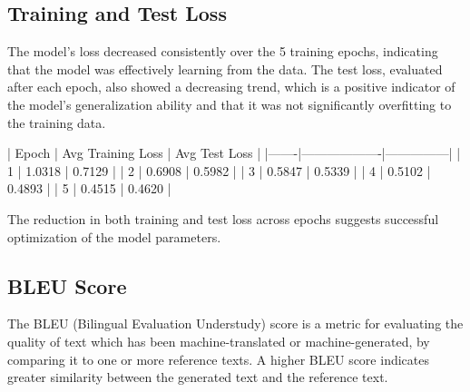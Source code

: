 \documentclass[a4paper, 12pt]{article}
\begin{document}
\begin{itemize}
\subsection{Training and Test Loss}
The model's loss decreased consistently over the 5 training epochs, indicating that the model was effectively learning from the data. The test loss, evaluated after each epoch, also showed a decreasing trend, which is a positive indicator of the model's generalization ability and that it was not significantly overfitting to the training data.

| Epoch | Avg Training Loss | Avg Test Loss |
|-------|-------------------|---------------|
| 1     | 1.0318            | 0.7129        |
| 2     | 0.6908            | 0.5982        |
| 3     | 0.5847            | 0.5339        |
| 4     | 0.5102            | 0.4893        |
| 5     | 0.4515            | 0.4620        |


The reduction in both training and test loss across epochs suggests successful optimization of the model parameters.

\subsection{BLEU Score}
The BLEU (Bilingual Evaluation Understudy) score is a metric for evaluating the quality of text which has been machine-translated or machine-generated, by comparing it to one or more reference texts. A higher BLEU score indicates greater similarity between the generated text and the reference text.


\end{itemize}
\end{document}
